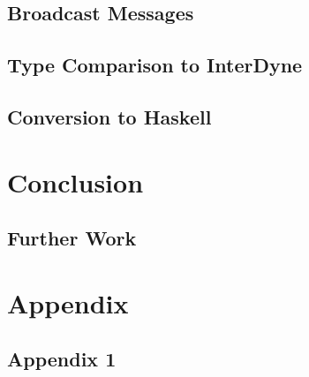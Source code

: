 \documentclass{article}
\begin{document}
\subsection{Broadcast Messages}

\subsection{Type Comparison to InterDyne}

\subsection{Conversion to Haskell}




\section{Conclusion}



\subsection{Further Work}
 
\section{Appendix}

\subsection{Appendix 1} %
%











     
\end{document}
